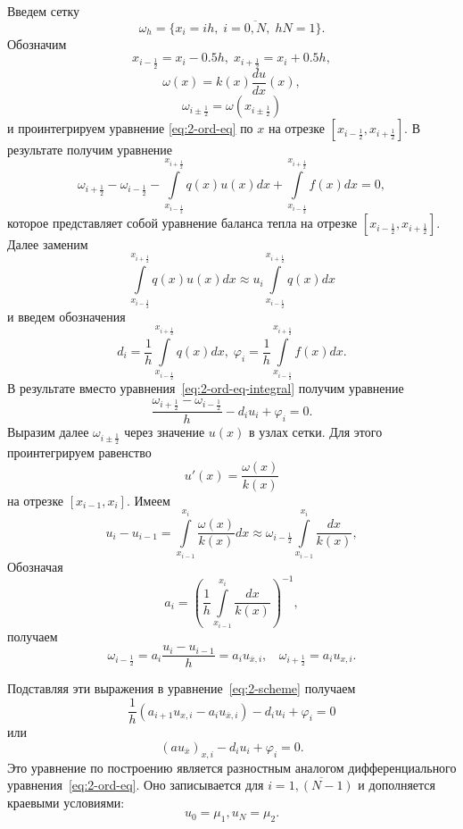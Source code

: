 \documentclass[11pt,a4paper,twoside,listtotoc,bibtotoc]{report}
\numberwithin{equation}{section}
\theoremstyle{definition}
\theoremstyle{plain}
\begin{document}
Введем сетку
%
$$
    \omega_h = \{ x_i = ih,\;i = \overline{0, N},\;hN = 1\}.
$$
%
Обозначим
%
$$
    x_{i-\frac12} = x_i - 0.5h,\;x_{i+\frac12} = x_i + 0.5h,
$$
%
%
$$
    \omega(x) = k(x)\frac{du}{dx}(x),
$$
%
%
$$
    \omega_{i \pm \frac12} = \omega(x_{i \pm \frac12})
$$
%
и проинтегрируем уравнение \eqref{eq:2-ord-eq} по $x$ на отрезке $[x_{i-\frac12},
x_{i+\frac12}]$. В результате получим уравнение
%
\begin{equation}
    \label{eq:2-ord-eq-integral}
    \omega_{i+\frac12} - \omega_{i-\frac12} -
    \int\limits_{x_{i-\frac12}}^{x_{i+\frac12}} q(x)u(x)dx +
    \int\limits_{x_{i-\frac12}}^{x_{i+\frac12}} f(x)dx = 0,
\end{equation}
%
которое представляет собой уравнение баланса тепла на отрезке
$[x_{i-\frac12}, x_{i+\frac12}]$.
Далее заменим
%
$$
    \int\limits_{x_{i-\frac12}}^{x_{i+\frac12}} q(x)u(x)dx \approx
    u_i\int\limits_{x_{i-\frac12}}^{x_{i+\frac12}} q(x)dx
$$
%
и введем обозначения
%
\begin{equation}
    \label{eq:2-ord-eq-def}
    d_i = \frac{1}{h}\int\limits_{x_{i-\frac12}}^{x_{i+\frac12}} q(x)dx,\;
    \varphi_i = \frac{1}{h}\int\limits_{x_{i-\frac12}}^{x_{i+\frac12}} f(x)dx.
\end{equation}
%
В результате вместо уравнения~\eqref{eq:2-ord-eq-integral} получим уравнение
%
\begin{equation}
    \label{eq:2-scheme}
    \dfrac{\omega_{i+\frac12} - \omega_{i-\frac12}}{h} - d_iu_i+\varphi_i=0.
%
\end{equation}
%
Выразим далее $\omega_{i \pm \frac12}$ через значение $u(x)$
в узлах сетки. Для этого проинтегрируем равенство
%
$$
    u'(x) = \dfrac{\omega(x)}{k(x)}
$$
%
на отрезке $[x_{i-1}, x_i]$. Имеем
%
$$
    u_i-u_{i-1} = \int\limits_{x_{i-1}}^{x_i}\dfrac{\omega(x)}{k(x)}dx
        \approx \omega_{i-\frac12}\int\limits_{x_{i-1}}^{x_i}\dfrac{dx}{k(x)},
$$
%
Обозначая
%
\begin{equation}
    \label{eq:2_lab_a_i}
    a_i = \left(\dfrac1h \int\limits_{x_{i-1}}^{x_i}\dfrac{dx}{k(x)}\right)^{-1},
%
\end{equation}
%
получаем
%
$$
    \omega_{i-\frac12}=a_i\dfrac{u_i-u_{i-1}}{h}
    =a_iu_{\overline{x},i},~~~~\omega_{i+\frac12}=a_iu_{x,i}.
$$
%

Подставляя эти выражения в уравнение~\eqref{eq:2-scheme}
получаем
%
$$
    \dfrac1h(a_{i+1}u_{x,i}-a_iu_{\overline{x},i})-d_iu_i+\varphi_i=0
$$
%
или
%
\begin{equation}
    \label{eq:2_diff_eq}
    (au_{\overline{x}})_{x,i}-d_iu_i+\varphi_i=0.
%
\end{equation}
%
Это уравнение по построению является разностным аналогом
дифференциального уравнения~\eqref{eq:2-ord-eq}. Оно
записывается для $i=\overline{1, (N-1)}$ и дополняется
краевыми условиями:
%
\begin{equation}
    \label{eq:2_diff_eq_start}
    u_0=\mu_1, u_N=\mu_2.
%
\end{equation}
%
\end{document}
